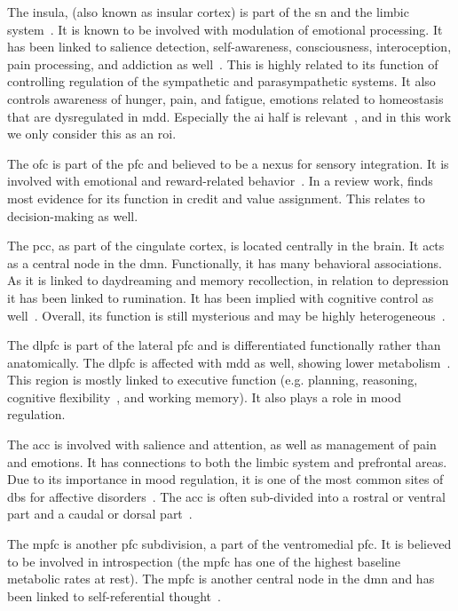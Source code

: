 The insula, (also known as insular cortex) is part of the \gls{sn} and the limbic system~\parencite{Uddin2017}.
It is known to be involved with modulation of emotional processing.
It has been linked to salience detection, self-awareness, consciousness, interoception, pain processing, and addiction as well~\parencite{Menon2010}.
This is highly related to its function of controlling regulation of the sympathetic and parasympathetic systems.
It also controls awareness of hunger, pain, and fatigue, emotions related to homeostasis that are dysregulated in \gls{mdd}.
Especially the \gls{ai} half is relevant~\parencite{Pasquini2020}, and in this work we only consider this as an \gls{roi}.

The \gls{ofc} is part of the \gls{pfc} and believed to be a nexus for sensory integration.
It is involved with emotional and reward-related behavior~\parencite{Kringelbach2005}.
In a review work, \textcite{Stalnaker2015} finds most evidence for its function in credit and value assignment.
This relates to decision-making as well.

The \gls{pcc}, as part of the cingulate cortex, is located centrally in the brain.
It acts as a central node in the \gls{dmn}.
Functionally, it has many behavioral associations.
As it is linked to daydreaming and memory recollection, in relation to depression it has been linked to rumination.
It has been implied with cognitive control as well~\parencite{Leech2012}.
Overall, its function is still mysterious and may be highly heterogeneous~\parencite{Leech2014}.

The \gls{dlpfc} is part of the lateral \gls{pfc} and is differentiated functionally rather than anatomically.
The \gls{dlpfc} is affected with \gls{mdd} as well, showing lower metabolism~\parencite{Pandya2012}.
This region is mostly linked to executive function (e.g. planning, reasoning, cognitive flexibility~\parencite{Dajani2015}, and working memory).
It also plays a role in mood regulation.

The \gls{acc} is involved with salience and attention, as well as management of pain and emotions.
It has connections to both the limbic system and prefrontal areas.
Due to its importance in mood regulation, it is one of the most common sites of \gls{dbs} for affective disorders~\parencite{Drevets2008}.
The \gls{acc} is often sub-divided into a rostral or ventral part and a caudal or dorsal part~\parencite[see][for more clarification on subdivisions]{Stevens2011}.

The \gls{mpfc} is another \gls{pfc} subdivision, a part of the ventromedial \gls{pfc}.
It is believed to be involved in introspection (the \gls{mpfc} has one of the highest baseline metabolic rates at rest).
The \gls{mpfc} is another central node in the \gls{dmn} and has been linked to self-referential thought~\parencite{Gusnard2001}.

